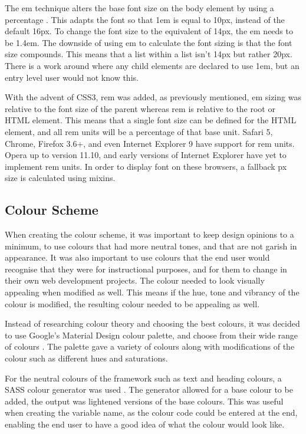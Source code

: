 The \gls{em} technique alters the base font size on the body element by using a percentage \citep{GUN16}. This adapts the font so that 1em is equal to 10px, instead of the default 16px. To change the font size to the equivalent of 14px, the \gls{em} needs to be 1.4em. The downside of using \gls{em} to calculate the font sizing is that the font size compounds. This means that a list within a list isn't 14px but rather 20px. There is a work around where any child elements are declared to use 1em, but an entry level user would not know this. 

With the advent of \gls{CSS}3, \gls{rem} was added, as previously mentioned, \gls{em} sizing was relative to the font size of the parent whereas \gls{rem} is relative to the root or \gls{HTML} element. This means that a single font size can be defined for the \gls{HTML} element, and all \gls{rem} units will be a percentage of that base unit. Safari 5, Chrome, Firefox 3.6+, and even Internet Explorer 9 have support for \gls{rem} units. Opera up to version 11.10, and early versions of Internet Explorer have yet to implement \gls{rem} units. In order to display font on these browsers, a fallback \gls{px} size is calculated using \gls{mixins}. 

\subsection*{Colour Scheme}
When creating the colour scheme, it was important to keep design opinions to a minimum, to use colours that had more neutral tones, and that are not garish in appearance. It was also important to use colours that the end user would recognise that they were for instructional purposes, and for them to change in their own web development projects. The colour needed to look visually appealing when modified as well. This means if the hue, tone and vibrancy of the colour is modified, the resulting colour needed to be appealing as well. 

Instead of researching colour theory and choosing the best colours, it was decided to use Google's Material Design colour palette, and choose from their wide range of colours \citep{Google17}. The palette  gave a variety of colours along with modifications of the colour such as different hues and saturations.

For the neutral colours of the framework such as text and heading colours, a \gls{SASS} colour generator was used \citep{ARCH17}. The generator allowed for a base colour to be added, the output was lightened versions of the base colours. This was useful when creating the variable name, as the colour code could be entered at the end, enabling the end user to have a good idea of what the colour would look like. 


